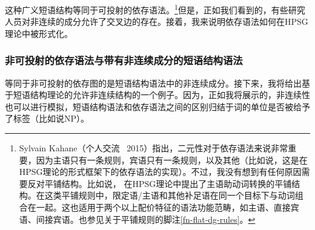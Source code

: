 这种广义短语结构等同于可投射的依存语法。\footnote{\label{fn-dg-binary-branching}%
Sylvain Kahane（个人交流 \, 2015）指出，二元性对于依存语法来说非常重要，因为主语只有一条规则，宾语只有一条规则，以及其他（比如说\citet{Kahane2009a}，这是在HPSG理论的形式框架下的依存语法的实现）。不过，我没有想到有任何原因需要反对平铺结构。比如说， \citet[]{GSag2000a-u}在HPSG理论中提出了主语助动词转换的平铺结构。在这类平铺规则中，限定语/主语和其他补足语在同一个目标下与动词组合在一起。这也适用于两个以上配价特征的语法功能范畴，如主语、直接宾语、间接宾语。也参见关于平铺规则的脚注\ref{fn-flat-dg-rules}。
}但是，正如我们看到的，有些研究人员对非连续的成分允许了交叉边的存在。接着，我来说明依存语法如何在HPSG理论中被形式化。

\subsubsection{非可投射的依存语法与带有非连续成分的短语结构语法}
\label{sec-discontinuous-constituents-HPSG}

等同于非可投射的依存图的是短语结构语法中的非连续成分。接下来，我将给出基于短语结构理论的允许非连续结构的一个例子。因为，正如我将展示的，非连续性也可以进行模拟，短语结构语法和依存语法之间的区别归结于词的单位是否被给予了标签（比如说NP）。

